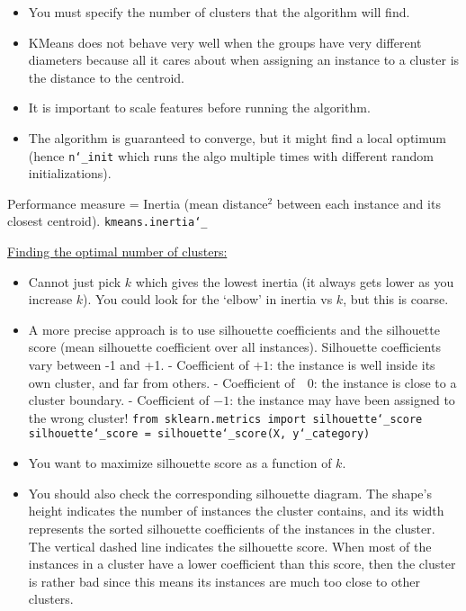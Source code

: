 \vspace{-3.0mm}
\begin{itemize}
\item
You must specify the number of clusters that the algorithm will find.
\item
KMeans does not behave very well when the groups have very different diameters because all it cares about
when assigning an instance to a cluster is the distance to the centroid.
\item
It is important to scale features before running the algorithm.
\item
The algorithm is guaranteed to converge, but it might find a local optimum\newline
(hence \texttt{n\char`_init} which runs the algo multiple times with different random initializations).
\end{itemize}

\vspace{-3.0mm}
Performance measure = Inertia (mean distance$^2$ between each instance and its closest centroid).\newline
\texttt{kmeans.inertia\char`_}\newline

\underline{Finding the optimal number of clusters:}

\vspace{-3.0mm}
\begin{itemize}
\item
Cannot just pick $k$ which gives the lowest inertia (it always gets lower as you increase $k$).
You could look for the `elbow' in inertia vs $k$, but this is coarse.
\item
A more precise approach is to use silhouette coefficients and the silhouette score (mean silhouette coefficient over all instances).
Silhouette coefficients vary between -1 and +1.\newline
- Coefficient of $+1$: the instance is well inside its own cluster, and far from others.\newline
- Coefficient of $\,\,\,\,0$: the instance is close to a cluster boundary.\newline
- Coefficient of $-1$: the instance may have been assigned to the wrong cluster!\newline
\texttt{from sklearn.metrics import silhouette\char`_score}\newline
\texttt{silhouette\char`_score = silhouette\char`_score(X, y\char`_category)}
\item
You want to maximize silhouette score as a function of $k$.
\item
You should also check the corresponding silhouette diagram.\newline
The shape's height indicates the number of instances the cluster contains,
and its width represents the sorted silhouette coefficients of the instances in the cluster.
The vertical dashed line indicates the silhouette score.
When most of the instances in a cluster have a lower coefficient than this score,
then the cluster is rather bad since this means its instances are much too close to other clusters.
\end{itemize}

